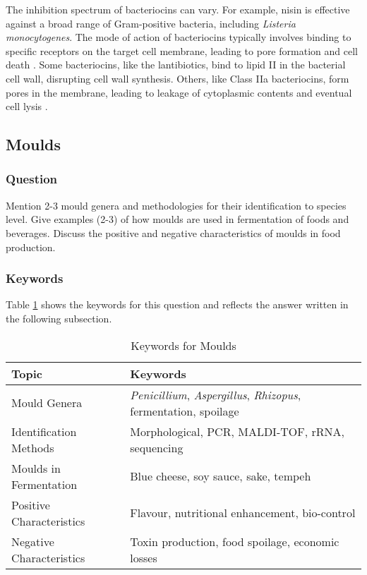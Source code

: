 The inhibition spectrum of bacteriocins can vary. For example, nisin is effective against a broad range of Gram-positive bacteria, including \textit{Listeria monocytogenes}. The mode of action of bacteriocins typically involves binding to specific receptors on the target cell membrane, leading to pore formation and cell death \cite*{L3-LAB}. Some bacteriocins, like the lantibiotics, bind to lipid II in the bacterial cell wall, disrupting cell wall synthesis. Others, like Class IIa bacteriocins, form pores in the membrane, leading to leakage of cytoplasmic contents and eventual cell lysis \cite*{L3-LAB}.

\subsection{Moulds}
\subsubsection*{Question}
Mention 2-3 mould genera and methodologies for their identification to species level. Give examples (2-3) of how moulds are used in fermentation of foods and beverages. Discuss the positive and negative characteristics of moulds in food production. 

\subsubsection*{Keywords}
Table \ref{tab:KW-Moulds} shows the keywords for this question and reflects the answer written in the following subsection.
\begin{table}[h]
    \centering
    \caption{Keywords for Moulds} 
    \label{tab:KW-Moulds}
    \begin{tabular}{l|l}
        \textbf{Topic} & \textbf{Keywords} \\
        \hline
        Mould Genera & \textit{Penicillium}, \textit{Aspergillus}, \textit{Rhizopus}, fermentation, spoilage \\

        Identification Methods & Morphological, PCR, MALDI-TOF, rRNA, sequencing \\

        Moulds in Fermentation & Blue cheese, soy sauce, sake, tempeh \\

        Positive Characteristics & Flavour, nutritional enhancement, bio-control \\

        Negative Characteristics & Toxin production, food spoilage, economic losses\\
    \end{tabular}
\end{table}

